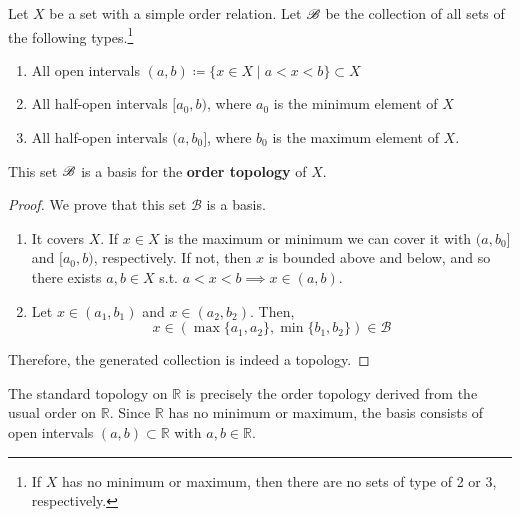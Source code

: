   \begin{definition}
    \label{def:order-topology}
    Let $X$ be a set with a simple order relation. Let $\B$ be the collection of all sets of the following types.\footnote{If $X$ has no minimum or maximum, then there are no sets of type of 2 or 3, respectively.}
    \begin{enumerate}
      \item All open intervals $(a, b) \coloneqq \{x \in X \mid a < x < b\} \subset X$
      \item All half-open intervals $[a_0, b)$, where $a_0$ is the minimum element of $X$
      \item All half-open intervals $(a, b_0]$, where $b_0$ is the maximum element of $X$. 
    \end{enumerate}
    This set $\B$ is a basis for the \textbf{order topology} of $X$. 
  \end{definition}
  \begin{proof}
    We prove that this set $\mathscr{B}$ is a basis. 
    \begin{enumerate}
      \item It covers $X$. If $x \in X$ is the maximum or minimum we can cover it with $(a, b_0]$ and $[a_0, b)$, respectively. If not, then $x$ is bounded above and below, and so there exists $a, b \in X$ s.t. $a < x < b \implies x \in (a, b)$. 

      \item Let $x \in (a_1, b_1)$ and $x \in (a_2, b_2)$. Then, 
      \begin{equation}
        x \in (\max\{a_1, a_2\}, \min\{b_1, b_2\}) \in \mathscr{B} 
      \end{equation}
    \end{enumerate}
    Therefore, the generated collection is indeed a topology. 
  \end{proof}

  \begin{example}
    The standard topology on $\mathbb{R}$ is precisely the order topology derived from the usual order on $\mathbb{R}$. Since $\mathbb{R}$ has no minimum or maximum, the basis consists of open intervals $(a, b) \subset \mathbb{R}$ with $a, b \in \mathbb{R}$. 
  \end{example}


